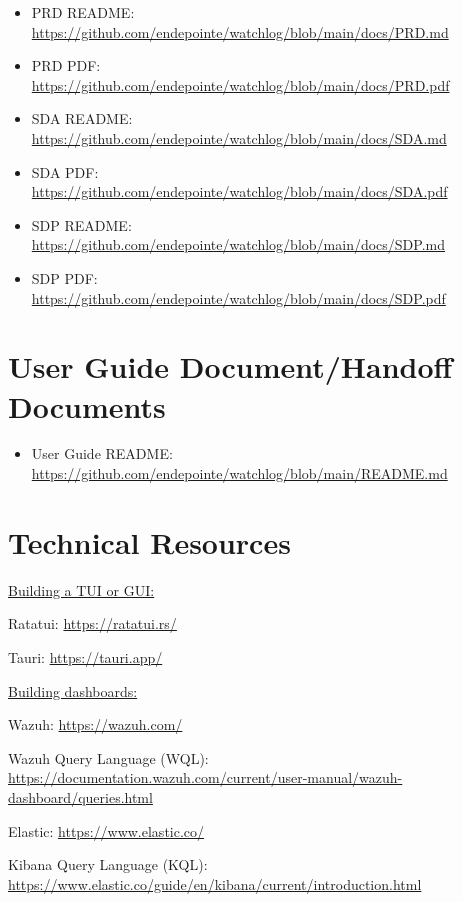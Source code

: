 \documentclass{article}
\begin{document}
\begin{itemize}[label=]
    \item PRD README: \url{https://github.com/endepointe/watchlog/blob/main/docs/PRD.md}
    \item PRD PDF: \url{https://github.com/endepointe/watchlog/blob/main/docs/PRD.pdf}
    \item SDA README: \url{https://github.com/endepointe/watchlog/blob/main/docs/SDA.md}
    \item SDA PDF: \url{https://github.com/endepointe/watchlog/blob/main/docs/SDA.pdf}
    \item SDP README: \url{https://github.com/endepointe/watchlog/blob/main/docs/SDP.md}
    \item SDP PDF: \url{https://github.com/endepointe/watchlog/blob/main/docs/SDP.pdf}
\end{itemize}


\section{User Guide Document/Handoff Documents}

\begin{itemize}
    \item User Guide README: \url{https://github.com/endepointe/watchlog/blob/main/README.md}
\end{itemize}


\section{Technical Resources}

\underline{Building a TUI or GUI:}\vspace{0.25cm}

Ratatui: \url{https://ratatui.rs/}

Tauri: \url{https://tauri.app/}\vspace{0.25cm}

\underline{Building dashboards:}\vspace{0.25cm}

Wazuh: \url{https://wazuh.com/}

Wazuh Query Language (WQL): \url{https://documentation.wazuh.com/current/user-manual/wazuh-dashboard/queries.html}

Elastic: \url{https://www.elastic.co/}

Kibana Query Language (KQL): \url{https://www.elastic.co/guide/en/kibana/current/introduction.html}
\end{document}

